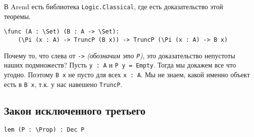 В Arend есть библиотека \texttt{Logic.Classical}, где есть доказательство этой теоремы.

\begin{verbatim}
\func (A : \Set) (B : A -> \Set):
    (\Pi (x : A) -> TruncP (B x)) -> TruncP (\Pi (x : A) -> B x)
\end{verbatim}

Почему то, что слева от \texttt{->} \textit{(обозначим это \texttt{P})}, это доказательство непустоты наших подмножеств? Пусть \texttt{y : A} и \texttt{P y = Empty}. Тогда мы докажем все что угодно. Поэтому \texttt{B x} не пусто для всех \texttt{x : A}. Мы не знаем, какой именно объект есть в \texttt{B x}, т.к. у нас навешено \texttt{TruncP}.

\subsection{Закон исключенного третьего}

\begin{verbatim}
lem (P : \Prop) : Dec P
\end{verbatim}
